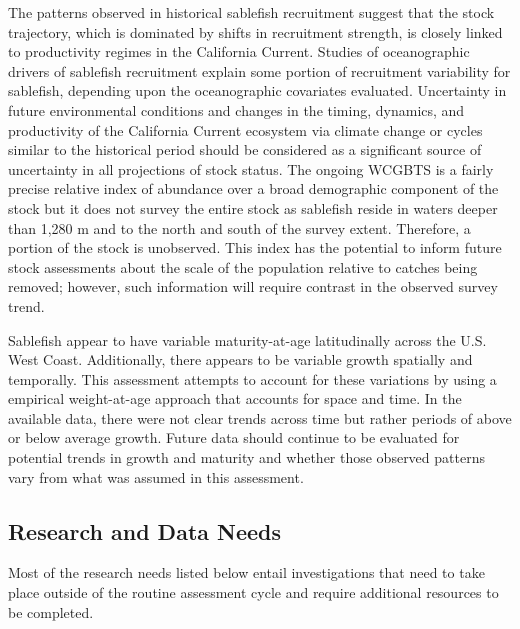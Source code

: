 \documentclass[
  english,
]{article}
\begin{document}
The patterns observed in historical sablefish recruitment suggest that
the stock trajectory, which is dominated by shifts in recruitment
strength, is closely linked to productivity regimes in the California
Current. Studies of oceanographic drivers of sablefish recruitment
explain some portion of recruitment variability for sablefish, depending
upon the oceanographic covariates evaluated. Uncertainty in future
environmental conditions and changes in the timing, dynamics, and
productivity of the California Current ecosystem via climate change or
cycles similar to the historical period should be considered as a
significant source of uncertainty in all projections of stock status.
The ongoing WCGBTS is a fairly precise relative index of abundance over
a broad demographic component of the stock but it does not survey the
entire stock as sablefish reside in waters deeper than 1,280 m and to
the north and south of the survey extent. Therefore, a portion of the
stock is unobserved. This index has the potential to inform future stock
assessments about the scale of the population relative to catches being
removed; however, such information will require contrast in the observed
survey trend.

Sablefish appear to have variable maturity-at-age latitudinally across
the U.S. West Coast. Additionally, there appears to be variable growth
spatially and temporally. This assessment attempts to account for these
variations by using a empirical weight-at-age approach that accounts for
space and time. In the available data, there were not clear trends
across time but rather periods of above or below average growth. Future
data should continue to be evaluated for potential trends in growth and
maturity and whether those observed patterns vary from what was assumed
in this assessment.

\subsection{Research and Data Needs}\label{research-and-data-needs-1}

Most of the research needs listed below entail investigations that need
to take place outside of the routine assessment cycle and require
additional resources to be completed.
\end{document}
